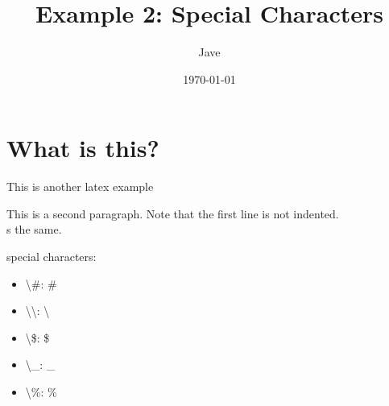 \documentclass[letterpaper, 12pt]{article}
\begin{document}
\date{\today}
\title{Example 2: Special Characters}
\author{Jave}
\maketitle
\section{What is this?}
This is another latex example

This is a second paragraph. Note that the first line is not indented.\\ %
s the same.

\noindent special characters:
\begin{itemize}
    \item \textbackslash{}\#: \#           
    \item \textbackslash{}\textbackslash: \textbackslash 
    \item \textbackslash{}\$: \$            
    \item \textbackslash{}\_: \_
    \item \textbackslash{}\%: \%
\end{itemize}
\end{document}

